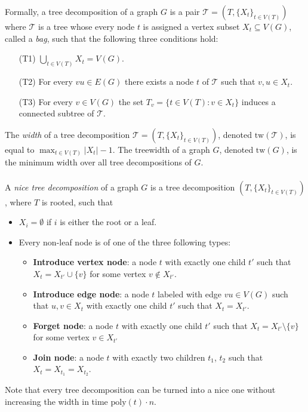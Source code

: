 \documentclass[en]{pracamgr}
\theoremstyle{definition}
\begin{document}
Formally, a tree decomposition of a graph $G$ is a pair $\mathcal{T} = (T, \{X_t\}_{t\in V(T)})$ where $\mathcal{T}$ is a tree whose every node $t$ is assigned a vertex subset $X_t \subseteq V(G)$, called a \emph{bag}, such that the following three conditions hold:
\begin{itemize}
	\item[(T1)] $\bigcup_{t\in V(T)}X_t = V(G)$.
	\item[(T2)] For every $vu \in E(G)$ there exists a node $t$ of $\mathcal{T}$ such that $v,u \in X_t$.
	\item[(T3)] For every $v \in V(G)$ the set $T_v = \{t \in V(T): v \in X_t\}$ induces a connected subtree of $\mathcal{T}$.
\end{itemize}

The \emph{width} of a tree decomposition $\mathcal{T} = (T,\{X_t\}_{t\in V(T)})$, denoted $\textrm{tw}(\mathcal{T})$, is equal to $\max_{t \in V(T)} |X_t| - 1$. The treewidth of a graph $G$, denoted $\textrm{tw}(G)$, is the minimum width over all tree decompositions of $G$.
\\\\
A \emph{nice tree decomposition} of a graph $G$ is a tree decomposition $(T, \{X_t\}_{t \in V(T)})$, where $T$ is rooted, such that
\begin{itemize}
	\item $X_i = \emptyset$ if $i$ is either the root or a leaf.
	\item Every non-leaf node is of one of the three following types:
	\begin{itemize}
		\item \textbf{Introduce vertex node}: a node $t$ with exactly one child $t'$ such that $X_t = X_{t'} \cup \{v\}$ for some vertex $v \notin X_{t'}$.
		\item \textbf{Introduce edge node}: a node $t$ labeled with edge $vu \in V(G)$ such that $u,v \in X_t$ with exactly one child $t'$ such that $X_t = X_{t'}$.
		\item \textbf{Forget node}: a node $t$ with exactly one child $t'$ such that $X_t = X_{t'} \setminus \{v\}$ for some vertex $v \in X_{t'}$
		\item \textbf{Join node}: a node $t$ with exactly two children $t_1$, $t_2$ such that $X_t = X_{t_1} = X_{t_2}$.
	\end{itemize}
\end{itemize}
Note that every tree decomposition can be turned into a nice one without increasing the width in time $\textrm{poly}(t) \cdot n$.
\end{document}
